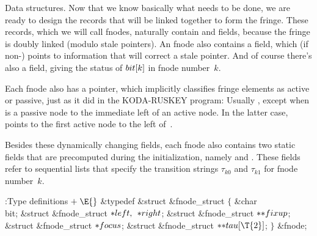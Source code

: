 \fi

Data structures. Now that we know basically what needs to be done,
we are ready to design the records that will be linked together
to form the fringe. These records, which we will call fnodes, naturally
contain  and  fields, because the fringe is doubly
linked (modulo stale pointers). An fnode also contains a  field,
which (if non-\PB{$\NULL$}) points to information that will correct a
stale  pointer. And of course there's also a  field,
giving the status of $\\{bit}[k]$ in fnode number~$k$.

Each fnode also has a  pointer, which implicitly classifies
fringe elements as active or passive, just as it did in the
{\mc KODA-RUSKEY} program: Usually , except when
 is a passive node to the immediate left of an active node.
In the latter case,  points to the first active node
to the left of~.

Besides these dynamically changing fields, each fnode also contains
two static fields that are precomputed during the initialization,
namely  and . These fields refer to
sequential
lists that specify the transition strings $\tau_{k0}$ and $\tau_{k1}$
for fnode number~$k$.

\Y\B\4:Type definitions\X${}\mathrel+\E{}$\6
\&{typedef} \&{struct} \&{fnode\_struct} ${}\{{}$\1\6
\&{char} \\{bit};\6
\&{struct} \&{fnode\_struct} ${}{*}\\{left},{}$ ${}{*}\\{right}{}$;\6
\&{struct} \&{fnode\_struct} ${}{*}{*}\\{fixup}{}$;\6
\&{struct} \&{fnode\_struct} ${}{*}\\{focus}{}$;\6
\&{struct} \&{fnode\_struct} ${}{*}{*}\\{tau}[\T{2}]{}$;\2\6
${}\}{}$ \&{fnode};\par
\fi

